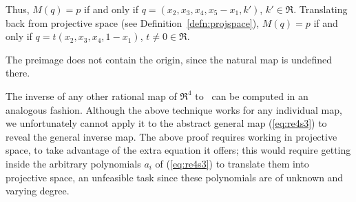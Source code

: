 Thus, $M(q) = p$ if and only if 
$q = (x_2,x_3,x_4,x_5 - x_1,k')$, $k' \in \Re$.
Translating back from projective space (see Definition~\ref{defn:projspace}),
$M(q) = p$ if and only if 
$q = t(x_2,x_3,x_4, 1-x_1)$, $t \neq 0 \in \Re$.

The preimage does not contain the origin, since the natural
map is undefined there.
\QED


The inverse of any other rational map of $\Re^4$ to \ can be computed
in an analogous fashion.
Although the above technique works for any individual map,
we unfortunately cannot apply it to the abstract general map (\ref{eq:re4s3})
to reveal the general inverse map.
The above proof requires working in projective space, to take 
advantage of the extra equation it offers;
this would require getting inside the arbitrary polynomials
$a_i$ of (\ref{eq:re4s3}) to translate them into projective space,
an unfeasible task
since these polynomials are of unknown and varying degree.













